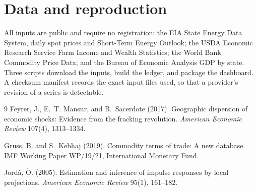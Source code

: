 \documentclass[11pt]{article}
\begin{document}
\section{Data and reproduction}

All inputs are public and require no registration: the EIA State Energy Data System, daily
spot prices and Short-Term Energy Outlook; the USDA Economic Research Service Farm Income
and Wealth Statistics; the World Bank Commodity Price Data; and the Bureau of Economic
Analysis GDP by state. Three scripts download the inputs, build the ledger, and package the
dashboard. A checksum manifest records the exact input files used, so that a provider's
revision of a series is detectable.

\begin{thebibliography}{9}
\setlength{\itemsep}{0.3em}
Feyrer, J., E.~T. Mansur, and B.~Sacerdote (2017). Geographic dispersion of economic
shocks: Evidence from the fracking revolution. \emph{American Economic Review} 107(4),
1313--1334.

Gruss, B. and S.~Kebhaj (2019). Commodity terms of trade: A new database. IMF Working
Paper WP/19/21, International Monetary Fund.

Jord{\`a}, {\`O}. (2005). Estimation and inference of impulse responses by local
projections. \emph{American Economic Review} 95(1), 161--182.
\end{thebibliography}
\end{document}
